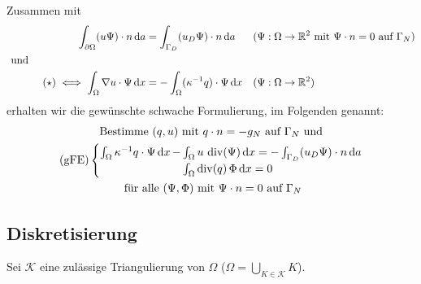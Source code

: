 Zusammen mit 
\begin{align*}
	&&\int_{\partial\Omega} (u\Psi) \cdot n \mathop{}\!\mathrm{d} a &= \int_{\Gamma_D} (u_D\Psi) \cdot n \mathop{}\!\mathrm{d} a &&(\Psi:\Omega \to \mathbb{R}^2 \text{ mit } \Psi \cdot n = 0 \text{ auf } \Gamma_N ) \\
	&\text{ und }\\
	&&(\star) \iff \int_{\Omega} \nabla u \cdot \Psi \mathop{}\!\mathrm{d} x &= - \int_{\Omega} (\kappa^{-1} q) \cdot \Psi \mathop{}\!\mathrm{d} x &&(\Psi:\Omega \to \mathbb{R}^2) 
\end{align*}
erhalten wir die gewünschte schwache Formulierung, im Folgenden  genannt:
\begin{gather*}
	\text{Bestimme } (q,u) \text{ mit } q\cdot n = -g_N \text{ auf } \Gamma_N \text{ und}\\
	\text{(gFE)}\begin{cases}
		\int_{\Omega} \kappa^{-1} q \cdot \Psi \mathop{}\!\mathrm{d} x \, - \mkern-15mu &\int_{\Omega} u \, \operatorname{div}(\Psi) \mathop{}\!\mathrm{d} x = - \int_{\Gamma_D} (u_D \Psi) \cdot n \mathop{}\!\mathrm{d} a\\
		&\int_{\Omega} \operatorname{div}(q) \, \Phi \mathop{}\!\mathrm{d} x = 0
	\end{cases}	\\
	\text{ für alle } (\Psi, \Phi) \text{ mit } \Psi \cdot n = 0 \text{ auf } \Gamma_N 
\end{gather*}

\subsection{Diskretisierung}

Sei $ \mathcal{K} $ eine zulässige Triangulierung von $ \Omega $ ($ \Omega = \bigcup_{K \in \mathcal{K}} K $).

